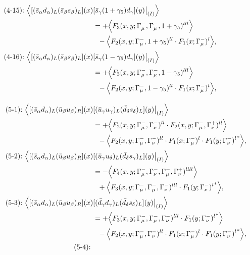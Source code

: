 \begin{align}
\mbox{(4-15):}\ 
\Big\langle
[(\bar s_\alpha d_\alpha)_L(\bar s_\beta s_\beta)_L](x)&
[\bar s_\gamma (1 + \gamma_5) d_\gamma](y)\big|_{(I)}
\Big\rangle
\notag\\*
&=
 + \Big\langle F_3(x,y;\Gamma_\mu^-,\Gamma_\mu^-,1+\gamma_5)^{lll}\Big\rangle
\notag\\*&\ \ 
 - \Big\langle F_2(x,y;\Gamma_\mu^-,1+\gamma_5)^{ll} \cdot F_1(x;\Gamma_\mu^-)^l\Big\rangle,
\\
\mbox{(4-16):}\ 
\Big\langle
[(\bar s_\alpha d_\alpha)_L(\bar s_\beta s_\beta)_L](x)&
[\bar s_\gamma (1 - \gamma_5) d_\gamma](y)\big|_{(I)}
\Big\rangle
\notag\\*
&=
 + \Big\langle F_3(x,y;\Gamma_\mu^-,\Gamma_\mu^-,1-\gamma_5)^{lll}\Big\rangle
\notag\\*&\ \ 
 - \Big\langle F_2(x,y;\Gamma_\mu^-,1-\gamma_5)^{ll} \cdot F_1(x;\Gamma_\mu^-)^l\Big\rangle,
\\[3mm]
\mbox{(5-1):}\ 
\Big\langle
[(\bar s_\alpha d_\alpha)_L(\bar u_\beta u_\beta)_R](x)&
[(\bar u_\gamma u_\gamma)_L(\bar d_\delta s_\delta)_L](y)\big|_{(I)}
\Big\rangle
\notag\\*
&=
 + \Big\langle F_2(x,y;\Gamma_\mu^-,\Gamma_\nu^-)^{ll} \cdot F_2(x,y;\Gamma_\mu^-,\Gamma_\nu^+)^{ll}\Big\rangle
\notag\\*&\ \ 
 - \Big\langle F_2(x,y;\Gamma_\mu^-,\Gamma_\nu^-)^{ll} \cdot F_1(x;\Gamma_\mu^-)^l \cdot {F_1(y;\Gamma_\nu^-)^l}^*\Big\rangle,
\\
\mbox{(5-2):}\ 
\Big\langle
[(\bar s_\alpha d_\alpha)_L(\bar u_\beta u_\beta)_R](x)&
[(\bar u_\gamma u_\delta)_L(\bar d_\delta s_\gamma)_L](y)\big|_{(I)}
\Big\rangle
\notag\\*
&=
 - \Big\langle F_4(x,y;\Gamma_\mu^-,\Gamma_\nu^-,\Gamma_\mu^-,\Gamma_\nu^+)^{llll}\Big\rangle
\notag\\*&\ \ 
 + \Big\langle F_3(x,y;\Gamma_\mu^-,\Gamma_\mu^-,\Gamma_\nu^-)^{lll} \cdot {F_1(y;\Gamma_\nu^-)^l}^*\Big\rangle,
\\
\mbox{(5-3):}\ 
\Big\langle
[(\bar s_\alpha d_\alpha)_L(\bar u_\beta u_\beta)_R](x)&
[(\bar d_\gamma d_\gamma)_L(\bar d_\delta s_\delta)_L](y)\big|_{(I)}
\Big\rangle
\notag\\*
&=
 + \Big\langle F_3(x,y;\Gamma_\mu^-,\Gamma_\mu^-,\Gamma_\nu^-)^{lll} \cdot {F_1(y;\Gamma_\nu^-)^l}^*\Big\rangle
\notag\\*&\ \ 
 - \Big\langle F_2(x,y;\Gamma_\mu^-,\Gamma_\nu^-)^{ll} \cdot F_1(x;\Gamma_\mu^-)^l \cdot {F_1(y;\Gamma_\nu^-)^l}^*\Big\rangle,
\\
\mbox{(5-4):}\ 

\end{align}
